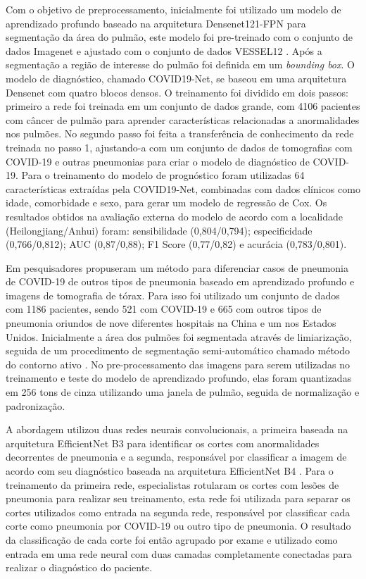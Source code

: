 Com o objetivo de preprocessamento, inicialmente foi utilizado um modelo de aprendizado profundo baseado na arquitetura Densenet121-FPN \cite{huang2017densely} \cite{lin2017feature} para segmentação da área do pulmão, este modelo foi pre-treinado com o conjunto de dados Imagenet \cite{deng2009imagenet} e ajustado com o conjunto de dados VESSEL12 \cite{rudyanto2014comparing}. Após a segmentação a região de interesse do pulmão foi definida em um \textit{bounding box}. O modelo de diagnóstico, chamado COVID19-Net, se baseou em uma arquitetura Densenet \cite{huang2017densely} com quatro blocos densos. O treinamento foi dividido em dois passos: primeiro a rede foi treinada em um conjunto de dados grande, com 4106 pacientes com câncer de pulmão para aprender características relacionadas a anormalidades nos pulmões. No segundo passo foi feita a transferência de conhecimento da rede treinada no passo 1, ajustando-a com um conjunto de dados de tomografias com COVID-19 e outras pneumonias para criar o modelo de diagnóstico de COVID-19. Para o treinamento do modelo de prognóstico foram utilizadas 64 características extraídas pela COVID19-Net, combinadas com dados clínicos como idade, comorbidade e sexo, para gerar um modelo de regressão de Cox. Os resultados obtidos na avaliação externa do modelo de acordo com a localidade (Heilongjiang/Anhui) foram: sensibilidade (0,804/0,794); especificidade (0,766/0,812); AUC (0,87/0,88); F1 Score (0,77/0,82) e acurácia (0,783/0,801).

Em \cite{bai2020artificial} pesquisadores propuseram um método para diferenciar casos de pneumonia de COVID-19 de outros tipos de pneumonia baseado em aprendizado profundo e imagens de tomografia de tórax. Para isso foi utilizado um conjunto de dados com 1186 pacientes, sendo 521 com COVID-19 e 665 com outros tipos de pneumonia oriundos de nove diferentes hospitais na China e um nos Estados Unidos. Inicialmente a área dos pulmões foi segmentada através de limiarização, seguida de um procedimento de segmentação semi-automático chamado método do contorno ativo \cite{kass1988snakes}. No pre-processamento das imagens para serem utilizadas no treinamento e teste do modelo de aprendizado profundo, elas foram quantizadas em 256 tons de cinza utilizando uma janela de pulmão, seguida de normalização e padronização. 

A abordagem utilizou duas redes neurais convolucionais, a primeira baseada na arquitetura EfficientNet B3 \cite{tan2019efficientnet} para identificar os cortes com anormalidades decorrentes de pneumonia e a segunda, responsável por classificar a imagem de acordo com seu diagnóstico baseada na arquitetura EfficientNet B4 \cite{tan2019efficientnet}. Para o treinamento da primeira rede, especialistas rotularam os cortes com lesões de pneumonia para realizar seu treinamento, esta rede foi utilizada para separar os cortes utilizados como entrada na segunda rede, responsável por classificar cada corte como pneumonia por COVID-19 ou outro tipo de pneumonia. O resultado da classificação de cada corte foi então agrupado por exame e utilizado como entrada em uma rede neural com duas camadas completamente conectadas para realizar o diagnóstico do paciente.

